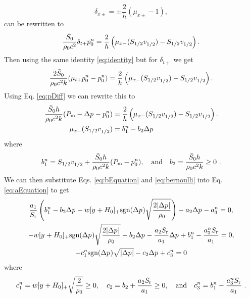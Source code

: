 \documentclass[dvipsnames]{article}
\begin{document}
\begin{equation}\label{eq:identity}
    \delta_{x\pm} = \pm\frac{2}{h}(\mu_{x\pm} - 1),
\end{equation} 
can be rewritten to
\begin{equation}
    \frac{\bar S_0}{\rho_0 c^2}\delta_{t+}p_0^n = \frac{2}{h} \left(\mu_{x-}(S_{1/2}v_{1/2}^{})-S_{1/2}v_{1/2}^{}\right).
\end{equation}
Then using the same identity \eqref{eq:identity} but for $\delta_{t+}$ we get
\begin{equation}
    \frac{2\bar S_0}{\rho_0 c^2k}(\mu_{t+}p_0^n-p_0^n) = \frac{2}{h} \left(\mu_{x-}(S_{1/2}v_{1/2}^{})-S_{1/2}v_{1/2}^{}\right).
\end{equation}
Using Eq. \eqref{eq:pDiff} we can rewrite this to
\begin{align}
    \frac{\bar S_0h}{\rho_0 c^2k}(P_\text{m} - \Delta p^{}-p_0^n) &= \frac{2}{h} \left(\mu_{x-}(S_{1/2}v_{1/2}^{})-S_{1/2}v_{1/2}^{}\right).\nonumber\\
    \mu_{x-}(S_{1/2}v_{1/2}^{}) &= b_1^n - b_2\Delta p^{}\label{eq:bEquation}
\end{align}
where
\begin{equation}\label{eq:bCoeffs}
    b_1^n = S_{1/2}v_{1/2}^{} + \frac{\bar S_0h}{\rho_0 c^2k} (P_\text{m} - p_0^n), \quad \text{and} \quad b_2 = \frac{\bar S_0h}{\rho_0 c^2k} \geq 0\ .
\end{equation}
We can then substitute Eqs. \eqref{eq:bEquation} and \eqref{eq:bernoulli} into Eq. \eqref{eq:aEquation} to get
\begin{gather}
    \frac{a_1}{S_\text{r}}\left(b_1^n - b_2\Delta p^{} - w[y^{}+H_0]_+\text{sgn}(\Delta p^{})\sqrt{\frac{2|\Delta p^{}|}{\rho_0}}\right) - a_2 \Delta p^{} - a_3^n = 0,\nonumber\\
    - w[y^{}+H_0]_+\text{sgn}(\Delta p^{})\sqrt{\frac{2|\Delta p^{}|}{\rho_0}} - b_2\Delta p^{} - \frac{a_2S_\text{r}}{a_1} \Delta p^{} + b_1^n - \frac{a_3^nS_\text{r}}{a_1} = 0,\nonumber\\
    -c_1^n\text{sgn}(\Delta p^{})\sqrt{|\Delta p^{}|} - c_2\Delta p^{} + c_3^n = 0\label{eq:cEquation}
\end{gather}
where
\begin{equation}\label{eq:cCoeffs}
    c_1^n = w[y^{} + H_0]_+\sqrt{\frac{2}{\rho_0}} \geq 0, \quad c_2 = b_2 + \frac{a_2S_\text{r}}{a_1} \geq 0, \quad \text{and}\quad c_3^n = b_1^n - \frac{a_3^nS_\text{r}}{a_1}\ .
\end{equation}
\end{document}
